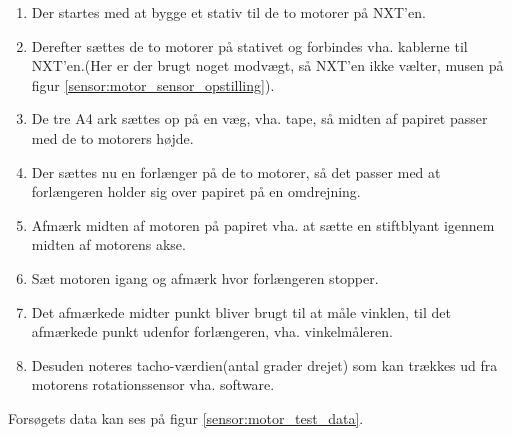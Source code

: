 \begin{enumerate}
\item Der startes med at bygge et stativ til de to motorer på NXT'en.
\item Derefter sættes de to motorer på stativet og forbindes vha. kablerne til NXT'en.(Her er der brugt noget modvægt, så NXT'en ikke vælter, musen på figur \ref{sensor:motor_sensor_opstilling}).
\item De tre A4 ark sættes op på en væg, vha. tape, så midten af papiret passer med de to motorers højde.
\item Der sættes nu en forlænger på de to motorer, så det passer med at forlængeren holder sig over papiret på en omdrejning.
\item Afmærk midten af motoren på papiret vha. at sætte en stiftblyant igennem midten af motorens akse.
\item Sæt motoren igang og afmærk hvor forlængeren stopper.
\item Det afmærkede midter punkt bliver brugt til at måle vinklen, til det afmærkede punkt udenfor forlængeren, vha. vinkelmåleren.
\item Desuden noteres tacho-værdien(antal grader drejet) som kan trækkes ud fra motorens rotationssensor vha. software.
\end{enumerate}

Forsøgets data kan ses på figur \ref{sensor:motor_test_data}.
\\

